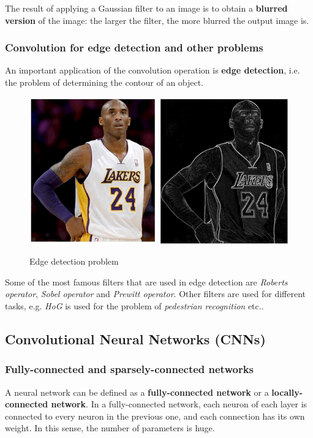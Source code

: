The result of applying a Gaussian filter to an image is to obtain a \textbf{blurred version} of the image: the larger the filter, the more blurred the output image is.

\subsubsection{Convolution for edge detection and other problems}
An important application of the convolution operation is \textbf{edge detection}, i.e. the problem of determining the contour of an object.

\begin{figure}[h!]
		\centering
        \includegraphics[scale = 1.5]{img/edge detection.jpg}
		\label{mi}
        \caption{Edge detection problem}
\end{figure}

Some of the most famous filters that are used in edge detection are \textit{Roberts operator}, \textit{Sobel operator} and \textit{Prewitt operator}. Other filters are used for different tasks, e.g. \textit{HoG} is used for the problem of \textit{pedestrian recognition} etc..

\subsection{Convolutional Neural Networks (CNNs)} 
\subsubsection{Fully-connected and sparsely-connected networks}
A neural network can be defined as a \textbf{fully-connected network} or a \textbf{locally-connected network}. In a fully-connected network, each neuron of each layer is connected to every neuron in the previous one, and each connection has its own weight. In this sense, the number of parameters is huge.

